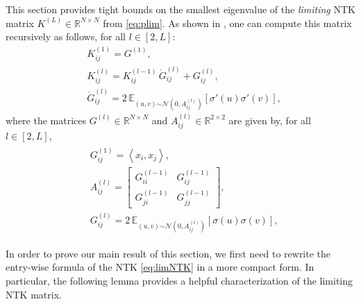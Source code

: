 \documentclass[11pt]{article}
\def\RR{\mathbb{R}}
\newcommand{\E}{\mathbb{E}}
\newcommand{\distas}[1]{\mathbin{\overset{#1}{\sim}}}
\newcommand{\inner}[1]{\left\langle#1\right\rangle}
\begin{document}
This section provides tight bounds on the smallest eigenvalue of the {\em limiting} NTK matrix $K^{(L)}\in\RR^{N\times N}$ from \eqref{eq:plim}.
As shown in \citep{JacotEtc2018}, one can compute this matrix recursively as follows, for all $l\in[2,L]$:
    \begin{equation}\label{eq:limNTK}
    \begin{split}
	&K^{(1)}_{ij}=G^{(1)},\\
	&K^{(l)}_{ij}=K^{(l-1)}_{ij}\, \dot{G}^{(l)}_{ij} + G^{(l)}_{ij},\\
	&\dot{G}^{(l)}_{ij} = 2\, \E_{(u,v)\distas{}\mathcal{N}(0, A^{(l)}_{ij})} [\sigma'(u)\sigma'(v)] , 
    \end{split}
    \end{equation}
where the matrices $G^{(l)}\in\RR^{N\times N}$ and $A^{(l)}_{ij}\in\RR^{2\times 2}$ are given by, for all $l\in[2,L]$,
    \begin{align}\label{eq:limNTK2}
    \begin{split}
	&G^{(1)}_{ij}=\inner{x_i, x_j},\\
	&A^{(l)}_{ij} = \begin{bmatrix}G^{(l-1)}_{ii} & G^{(l-1)}_{ij}\\G^{(l-1)}_{ji} & G^{(l-1)}_{jj}\end{bmatrix},\\
	&G^{(l)}_{ij} = 2\, \E_{(u,v)\distas{}\mathcal{N}(0, A^{(l)}_{ij})} [\sigma(u)\sigma(v)] , 
    \end{split}
    \end{align}

In order to prove our main result of this section,  we first need to rewrite the entry-wise formula of the NTK \eqref{eq:limNTK} in a more compact form. In particular, the following lemma provides a helpful characterization of the limiting NTK matrix.
\end{document}
